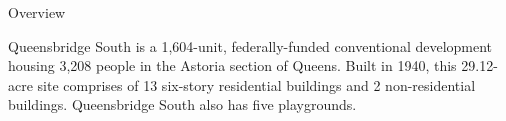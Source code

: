 Overview

Queensbridge South is a 1,604-unit, federally-funded conventional development housing 3,208 people in the Astoria section of Queens. Built in 1940, this 29.12-acre site comprises of 13 six-story residential buildings and 2 non-residential buildings. Queensbridge South also has five playgrounds. 